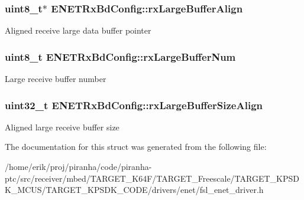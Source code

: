 \subsubsection[{\texorpdfstring{rx\+Large\+Buffer\+Align}{rxLargeBufferAlign}}]{\setlength{\rightskip}{0pt plus 5cm}uint8\+\_\+t$\ast$ E\+N\+E\+T\+Rx\+Bd\+Config\+::rx\+Large\+Buffer\+Align}\hypertarget{structENETRxBdConfig_a9b538f79a2e1e4f4bdf4eedb91547482}{}\label{structENETRxBdConfig_a9b538f79a2e1e4f4bdf4eedb91547482}
Aligned receive large data buffer pointer 
\subsubsection[{\texorpdfstring{rx\+Large\+Buffer\+Num}{rxLargeBufferNum}}]{\setlength{\rightskip}{0pt plus 5cm}uint8\+\_\+t E\+N\+E\+T\+Rx\+Bd\+Config\+::rx\+Large\+Buffer\+Num}\hypertarget{structENETRxBdConfig_a846425f94a3995cbbda6f9c6eab3d526}{}\label{structENETRxBdConfig_a846425f94a3995cbbda6f9c6eab3d526}
Large receive buffer number 
\subsubsection[{\texorpdfstring{rx\+Large\+Buffer\+Size\+Align}{rxLargeBufferSizeAlign}}]{\setlength{\rightskip}{0pt plus 5cm}uint32\+\_\+t E\+N\+E\+T\+Rx\+Bd\+Config\+::rx\+Large\+Buffer\+Size\+Align}\hypertarget{structENETRxBdConfig_a23fc2ecb950f5d7fb28043c6308ace55}{}\label{structENETRxBdConfig_a23fc2ecb950f5d7fb28043c6308ace55}
Aligned large receive buffer size 

The documentation for this struct was generated from the following file\+:\begin{DoxyCompactItemize}
\item 
/home/erik/proj/piranha/code/piranha-\/ptc/src/receiver/mbed/\+T\+A\+R\+G\+E\+T\+\_\+\+K64\+F/\+T\+A\+R\+G\+E\+T\+\_\+\+Freescale/\+T\+A\+R\+G\+E\+T\+\_\+\+K\+P\+S\+D\+K\+\_\+\+M\+C\+U\+S/\+T\+A\+R\+G\+E\+T\+\_\+\+K\+P\+S\+D\+K\+\_\+\+C\+O\+D\+E/drivers/enet/fsl\+\_\+enet\+\_\+driver.\+h\end{DoxyCompactItemize}
